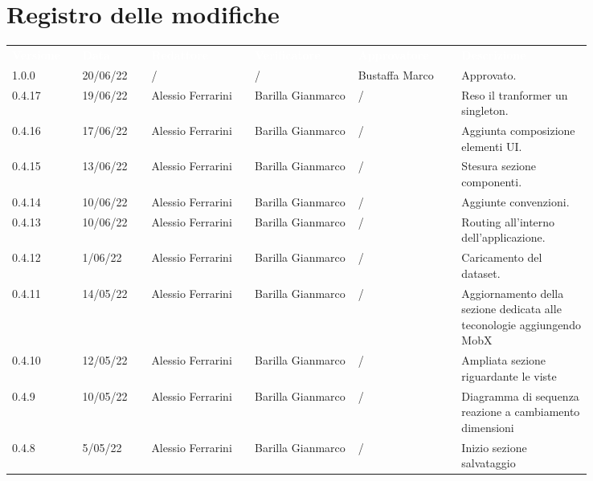 \section*{Registro delle modifiche}

{\renewcommand{\arraystretch}{1.5}
\scriptsize
\begin{tabular}{p{0.10\linewidth}p{0.10\linewidth}p{0.15\linewidth}p{0.15\linewidth}p{0.15\linewidth}p{0.19\linewidth}}
	\rowcolor[RGB]{33, 73, 50}
	\textcolor{white}{\textbf{Versione}} & \textcolor{white}{\textbf{Data}} &
	\textcolor{white}{\textbf{Redattore}} & \textcolor{white}{\textbf{Verificatore}} &
	\textcolor{white}{\textbf{Approvatore}} & \textcolor{white}{\textbf{Descrizione}}\\
	
	\rowcolor[RGB]{216, 235, 171}
	1.0.0 & 20/06/22 & / & / & Bustaffa Marco & Approvato. \\
	\rowcolor[RGB]{233, 245, 206}
	0.4.17 & 19/06/22 & Alessio Ferrarini & Barilla Gianmarco & / & Reso il tranformer un singleton.\\
	\rowcolor[RGB]{216, 235, 171}
	\rowcolor[RGB]{233, 245, 206}
	0.4.16 & 17/06/22 & Alessio Ferrarini & Barilla Gianmarco & / & Aggiunta composizione elementi UI.\\
	\rowcolor[RGB]{216, 235, 171}
	0.4.15 & 13/06/22 & Alessio Ferrarini & Barilla Gianmarco & / & Stesura sezione componenti. \\
	\rowcolor[RGB]{233, 245, 206}
	0.4.14 & 10/06/22 & Alessio Ferrarini & Barilla Gianmarco & / & Aggiunte convenzioni.\\
	\rowcolor[RGB]{216, 235, 171}
	0.4.13 & 10/06/22 & Alessio Ferrarini & Barilla Gianmarco & / & Routing all'interno dell'applicazione. \\
	\rowcolor[RGB]{233, 245, 206}
	0.4.12 & 1/06/22 & Alessio Ferrarini & Barilla Gianmarco & / & Caricamento del dataset.\\
	\rowcolor[RGB]{216, 235, 171}
	0.4.11 & 14/05/22 & Alessio Ferrarini & Barilla Gianmarco & / & Aggiornamento della sezione
  dedicata alle teconologie aggiungendo MobX \\
	\rowcolor[RGB]{233, 245, 206}
	0.4.10 & 12/05/22 & Alessio Ferrarini & Barilla Gianmarco & / & Ampliata sezione riguardante le
  viste \\
	\rowcolor[RGB]{216, 235, 171}
	0.4.9 & 10/05/22 & Alessio Ferrarini & Barilla Gianmarco & / & Diagramma di sequenza reazione
  a cambiamento dimensioni \\
	\rowcolor[RGB]{233, 245, 206}
	0.4.8 & 5/05/22 & Alessio Ferrarini & Barilla Gianmarco & / & Inizio sezione salvataggio

\end{tabular}}
